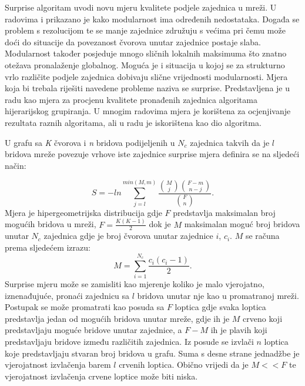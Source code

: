Surprise algoritam uvodi novu mjeru kvalitete podjele zajednica u mreži. U radovima \cite{blondel2008fast} i \cite{gamermann2022algorithm} prikazano je kako modularnost ima određenih nedostataka. Događa se problem s rezolucijom te se manje zajednice združuju s većima pri čemu može doći do situacije da povezanost čvorova unutar zajednice postaje slaba. Modularnost također posjeduje mnogo sličnih lokalnih maksimuma što znatno otežava pronalaženje globalnog. Moguća je i situacija u kojoj se za strukturno vrlo različite podjele zajednica dobivaju slične vrijednosti modularnosti. Mjera koja bi trebala riješiti navedene probleme naziva se surprise. Predstavljena je u radu \cite{aldecoa2010jerarca} kao mjera za procjenu kvalitete pronađenih zajednica algoritama hijerarijskog grupiranja. U mnogim radovima mjera je korištena za ocjenjivanje rezultata raznih algoritama, ali u radu \cite{gamermann2022algorithm} je iskorištena kao dio algoritma.


U grafu sa \textit{K} čvorova i \textit{n} bridova podijeljenih u $N_{c}$ zajednica takvih da je $l$ bridova mreže povezuje vrhove iste zajednice surprise mjera definira se na sljedeći način:

\begin{equation}
	S = - ln \sum_{j = l}^{min(M,m)} \frac{ {M \choose j} {F-m \choose n-j} }{ {F \choose n}}.
\end{equation}
Mjera je hipergeometrijska distribucija gdje $F$ predstavlja maksimalan broj mogućih bridova u mreži, $F = \frac{K(K-1)}{2}$ dok je $M$ maksimalan moguć broj bridova unutar $N_{c}$ zajednica gdje je broj čvorova unutar zajednice $i$, $c_{i}$. $M$ se računa prema sljedećem izrazu:
\begin{equation}
	M = \sum_{i=1}^{N_{c}} \frac{c_{i}(c_{i}-1)}{2}.
\end{equation} 
Surprise mjeru može se zamisliti kao mjerenje koliko je malo vjerojatno, iznenađujuće, pronaći zajednicu sa $l$ bridova unutar nje kao u promatranoj mreži. Postupak se može promatrati kao posuda sa $F$ loptica gdje svaka loptica predstavlja jedan od mogućih bridova unutar mreže, gdje ih je $M$ crveno koji predstavljaju moguće bridove unutar zajednice, a $F-M$ ih je plavih koji predstavljaju bridove između različitih zajednica. Iz posude se izvlači $n$ loptica koje predstavljaju stvaran broj bridova u grafu. Suma s desne strane jednadžbe je vjerojatnost izvlačenja barem $l$ crvenih loptica. Obično vrijedi da je $M << F$ te vjerojatnost izvlačenja crvene loptice može biti niska.


